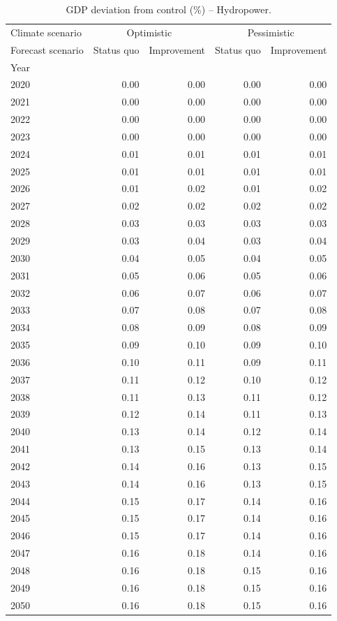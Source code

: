 \begin{table}
\caption{GDP deviation from control (\%) -- Hydropower.}
\label{tab:results_HYD_control_rel}
\centering
\begin{tabular}{lrrrr}
\toprule
Climate scenario & \multicolumn{2}{c}{Optimistic} & \multicolumn{2}{c}{Pessimistic} \\
Forecast scenario & Status quo & Improvement & Status quo & Improvement \\
Year &  &  &  &  \\
\midrule
2020 & 0.00 & 0.00 & 0.00 & 0.00 \\
2021 & 0.00 & 0.00 & 0.00 & 0.00 \\
2022 & 0.00 & 0.00 & 0.00 & 0.00 \\
2023 & 0.00 & 0.00 & 0.00 & 0.00 \\
2024 & 0.01 & 0.01 & 0.01 & 0.01 \\
2025 & 0.01 & 0.01 & 0.01 & 0.01 \\
2026 & 0.01 & 0.02 & 0.01 & 0.02 \\
2027 & 0.02 & 0.02 & 0.02 & 0.02 \\
2028 & 0.03 & 0.03 & 0.03 & 0.03 \\
2029 & 0.03 & 0.04 & 0.03 & 0.04 \\
2030 & 0.04 & 0.05 & 0.04 & 0.05 \\
2031 & 0.05 & 0.06 & 0.05 & 0.06 \\
2032 & 0.06 & 0.07 & 0.06 & 0.07 \\
2033 & 0.07 & 0.08 & 0.07 & 0.08 \\
2034 & 0.08 & 0.09 & 0.08 & 0.09 \\
2035 & 0.09 & 0.10 & 0.09 & 0.10 \\
2036 & 0.10 & 0.11 & 0.09 & 0.11 \\
2037 & 0.11 & 0.12 & 0.10 & 0.12 \\
2038 & 0.11 & 0.13 & 0.11 & 0.12 \\
2039 & 0.12 & 0.14 & 0.11 & 0.13 \\
2040 & 0.13 & 0.14 & 0.12 & 0.14 \\
2041 & 0.13 & 0.15 & 0.13 & 0.14 \\
2042 & 0.14 & 0.16 & 0.13 & 0.15 \\
2043 & 0.14 & 0.16 & 0.13 & 0.15 \\
2044 & 0.15 & 0.17 & 0.14 & 0.16 \\
2045 & 0.15 & 0.17 & 0.14 & 0.16 \\
2046 & 0.15 & 0.17 & 0.14 & 0.16 \\
2047 & 0.16 & 0.18 & 0.14 & 0.16 \\
2048 & 0.16 & 0.18 & 0.15 & 0.16 \\
2049 & 0.16 & 0.18 & 0.15 & 0.16 \\
2050 & 0.16 & 0.18 & 0.15 & 0.16 \\
\bottomrule
\end{tabular}
\end{table}
